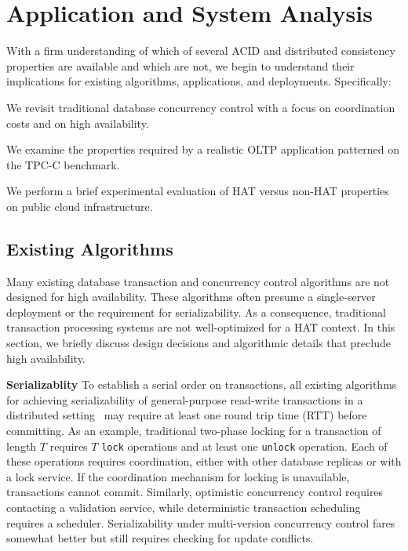 
\section{Application and System Analysis}
\label{sec:evaluation}

With a firm understanding of which of several ACID and distributed
consistency properties are available and which are not, we begin to
understand their implications for existing algorithms, applications,
and deployments. Specifically:

\begin{myenumerate}
\item We revisit traditional database concurrency control with a focus
  on coordination costs and on high availability.
\item We examine the properties required by a realistic OLTP
  application patterned on the TPC-C benchmark.
\item We perform a brief experimental evaluation of HAT versus non-HAT
  properties on public cloud infrastructure.
\end{myenumerate}

\subsection{Existing Algorithms}

Many existing database transaction and concurrency control algorithms
are not designed for high availability. These algorithms often presume
a single-server deployment or the requirement for serializability. As
a consequence, traditional transaction processing systems are not
well-optimized for a HAT context. In this section, we briefly discuss
design decisions and algorithmic details that preclude high
availability.

\vspace{.5em}\noindent\textbf{Serializablity} To establish a serial
order on transactions, all existing algorithms for achieving
serializability of general-purpose read-write transactions in a
distributed setting~\cite{bernstein-book} may require at least one
round trip time (RTT) before committing. As an example, traditional
two-phase locking for a transaction of length $T$ requires $T$
\texttt{lock} operations and at least one \texttt{unlock} operation.
Each of these operations requires coordination, either with other
database replicas or with a lock service. If the coordination
mechanism for locking is unavailable, transactions cannot
commit. Similarly, optimistic concurrency control requires contacting
a validation service, while deterministic transaction
scheduling~\cite{deterministic-scheduling} requires a
scheduler. Serializability under multi-version concurrency control
fares somewhat better but still requires checking for update
conflicts.

